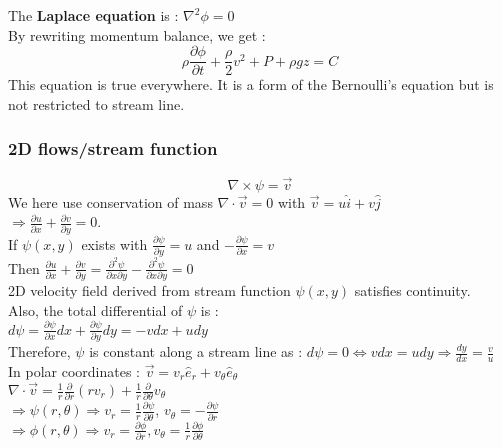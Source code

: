 \documentclass[../main.tex]{subfiles}
\begin{document}
The \textbf{Laplace equation} is : $\nabla^2 \phi = 0$\\

By rewriting momentum balance, we get : \begin{equation}
    \rho \frac{\partial \phi}{\partial t} + \frac{\rho}{2} v^2 + P + \rho g z = C
\end{equation}
This equation is true everywhere. It is a form of the Bernoulli's equation but is not restricted to stream line.\\

\subsubsection{2D flows/stream function}
\begin{equation}
    \nabla \times \psi = \Vec{v}
\end{equation}
We here use conservation of mass $\nabla \cdot \Vec{v} = 0$ with $\Vec{v} = u \hat{i}+ v\hat{j}$\\
$\Rightarrow \frac{\partial u}{\partial x} + \frac{\partial v}{\partial y} = 0$. \\

If $\psi(x,y)$ exists with $\frac{\partial \psi}{\partial y} = u$ and $-\frac{\partial \psi}{\partial x} = v$\\
Then $\frac{\partial u}{\partial x} + \frac{\partial v}{\partial y} = \frac{\partial^2 \psi}{\partial x \partial y} - \frac{\partial^2 \psi}{\partial x \partial y}= 0$\\

2D velocity field derived from stream function $\psi(x,y)$ satisfies continuity.\\

Also, the total differential of $\psi$ is : \\
$d \psi = \frac{\partial \psi}{\partial x}dx+ \frac{\partial \psi}{\partial y}dy = -vdx + udy$\\
Therefore, $\psi$ is constant along a stream line as : $d\psi = 0 \Leftrightarrow vdx = udy \Rightarrow \frac{dy}{dx} = \frac{v}{u}$\\

In polar coordinates : $\Vec{v} = v_r \hat{e}_r + v_\theta \hat{e}_\theta$\\
$\nabla \cdot \Vec{v} = \frac{1}{r} \frac{\partial}{\partial r}(rv_r) + \frac{1}{r}\frac{\partial}{\partial \theta} v_\theta$\\
$\Rightarrow \psi(r,\theta) \Rightarrow v_r= \frac{1}{r} \frac{\partial \psi}{\partial \theta}$, $v_\theta = -\frac{\partial \psi}{\partial r}$\\
$\Rightarrow \phi(r,\theta) \Rightarrow v_r = \frac{\partial \phi}{\partial r}, v_\theta = \frac{1}{r} \frac{\partial \phi}{\partial \theta}$
\end{document}
